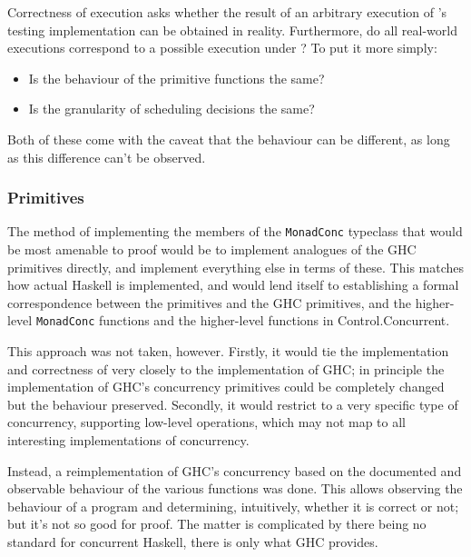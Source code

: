 Correctness of execution asks whether the result of an arbitrary
execution of \dejafu{}'s testing implementation can be obtained in
reality.  Furthermore, do all real-world executions correspond to a
possible execution under \dejafu{}? To put it more simply:

\begin{itemize}
\item Is the behaviour of the primitive functions the same?

\item Is the granularity of scheduling decisions the same?
\end{itemize}

Both of these come with the caveat that the behaviour can be
different, as long as this difference can't be observed.

\subsubsection{Primitives}
\label{sec:correctness-execution-primops}

The method of implementing the members of the \verb|MonadConc|
typeclass that would be most amenable to proof would be to implement
analogues of the GHC primitives directly, and implement everything
else in terms of these. This matches how actual Haskell is
implemented, and would lend itself to establishing a formal
correspondence between the \dejafu{} primitives and the GHC
primitives, and the higher-level \verb|MonadConc| functions and the
higher-level functions in Control.\-Concurrent.

This approach was not taken, however. Firstly, it would tie the
implementation and correctness of \dejafu{} very closely to the
implementation of GHC; in principle the implementation of GHC's
concurrency primitives could be completely changed but the behaviour
preserved. Secondly, it would restrict \dejafu{} to a very specific
type of concurrency, supporting low-level operations, which may not
map to all interesting implementations of concurrency.

Instead, a reimplementation of GHC's concurrency based on the
documented and observable behaviour of the various functions was
done. This allows observing the behaviour of a program and
determining, intuitively, whether it is correct or not; but it's not
so good for proof. The matter is complicated by there being no
standard for concurrent Haskell, there is only what GHC provides.


